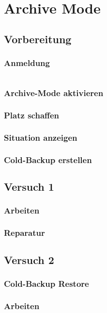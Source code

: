 \documentclass[11pt,a4paper,parskip=half]{scrartcl}
\begin{document}
\section{Archive Mode}
\subsection{Vorbereitung}
\subsubsection{Anmeldung}
\begin{lstlisting}
\end{lstlisting}
\subsubsection{Archive-Mode aktivieren}
\subsubsection{Platz schaffen}
\subsubsection{Situation anzeigen}
\subsubsection{Cold-Backup erstellen}

\subsection{Versuch 1}
\subsubsection{Arbeiten}
\subsubsection{Reparatur}

\subsection{Versuch 2}
\subsubsection{Cold-Backup Restore}
\subsubsection{Arbeiten}
\end{document}
